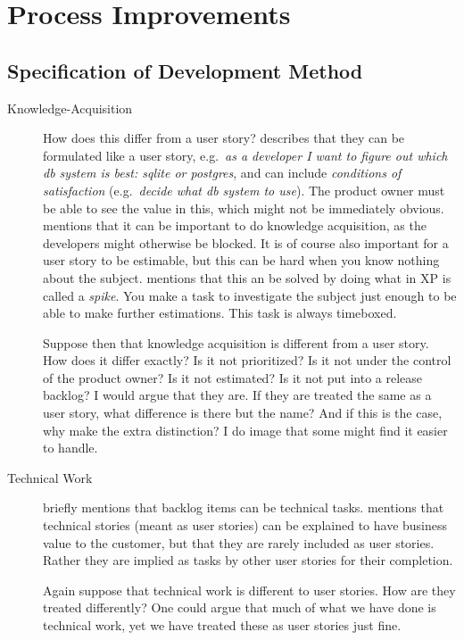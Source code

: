 \chapter{Process Improvements}
\dummy

\section{Specification of Development Method}
\dummy

\begin{description}
  \item[Knowledge-Acquisition] 
  How does this differ from a user story? \cite{rubin2012essential} describes that they can be formulated like a user story, e.g.\ \emph{as a developer I want to figure out which db system is best: sqlite or postgres}, and can include \emph{conditions of satisfaction} (e.g.\ \emph{decide what db system to use}). The product owner must be able to see the value in this, which might not be immediately obvious. \cite{rubin2012essential} mentions that it can be important to do knowledge acquisition, as the developers might otherwise be blocked. It is of course also important for a user story to be estimable, but this can be hard when you know nothing about the subject. \cite{cohn2004} mentions that this an be solved by doing what in XP is called a \emph{spike}. You make a task to investigate the subject just enough to be able to make further estimations. This task is always timeboxed.

  Suppose then that knowledge acquisition is different from a user story. How does it differ exactly? Is it not prioritized? Is it not under the control of the product owner? Is it not estimated? Is it not put into a release backlog? I would argue that they are. If they are treated the same as a user story, what difference is there but the name? And if this is the case, why make the extra distinction? I do image that some might find it easier to handle.
  \item[Technical Work] 
  \cite[The Product Backlog]{cohn2004} briefly mentions that backlog items can be technical tasks. \cite[pp. 90--91]{rubin2012essential} mentions that technical stories (meant as user stories) can be explained to have business value to the customer, but that they are rarely included as user stories. Rather they are implied as tasks by other user stories for their completion.

  Again suppose that technical work is different to user stories. How are they treated differently? One could argue that much of what we have done is technical work, yet we have treated these as user stories just fine.
\end{description}

